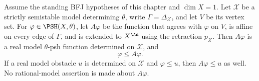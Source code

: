 \begin{lemma}
\label{lem:ch23-psh-vertex-chord}
Assume the standing BFJ hypotheses of this chapter and \(\dim X=1\).
Let \(\mathcal X\) be a strictly semistable model determining
\(\theta\), write \(\Gamma=\Delta_{\mathcal X}\), and let \(V\)
be its vertex set.  For \(\varphi\in\PSH(X,\theta)\), let
\(A\varphi\) be the function that agrees with \(\varphi\) on
\(V\), is affine on every edge of \(\Gamma\), and is extended to
\(X^{\An}\) using the retraction \(p_{\mathcal X}\).
Then \(A\varphi\) is a real model \(\theta\)-psh function determined
on \(\mathcal X\), and
\[
                 \varphi\leq A\varphi.
\]
If a real model obstacle \(u\) is determined on \(\mathcal X\) and
\(\varphi\leq u\), then \(A\varphi\leq u\) as well.
No rational-model assertion is made about \(A\varphi\).
\end{lemma}

